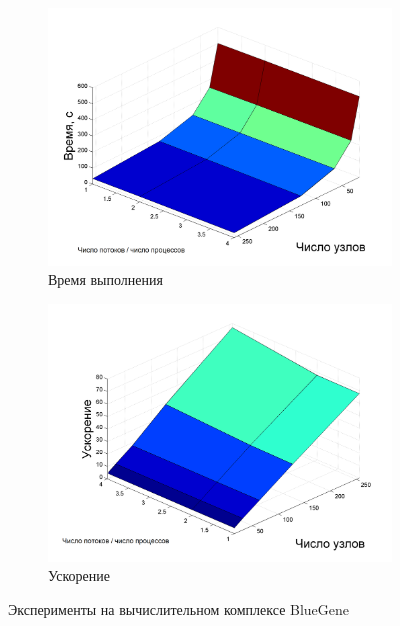 \documentclass[a4paper,12pt]{report}
\begin{document}
	\begin{figure}[H]
			\begin{subfigure}{0.5\textwidth}
				\includegraphics[width=\textwidth]{hyb_bg.png}
				\caption{Время выполнения}
			\end{subfigure}
			\begin{subfigure}{0.5\textwidth}
				\includegraphics[width=\textwidth]{hyb_bg_speedup.png}
				\caption{Ускорение}
			\end{subfigure}
			\caption{Эксперименты на вычислительном комплексе BlueGene}
			\label{bg}
		\end{figure}\par
\end{document}
